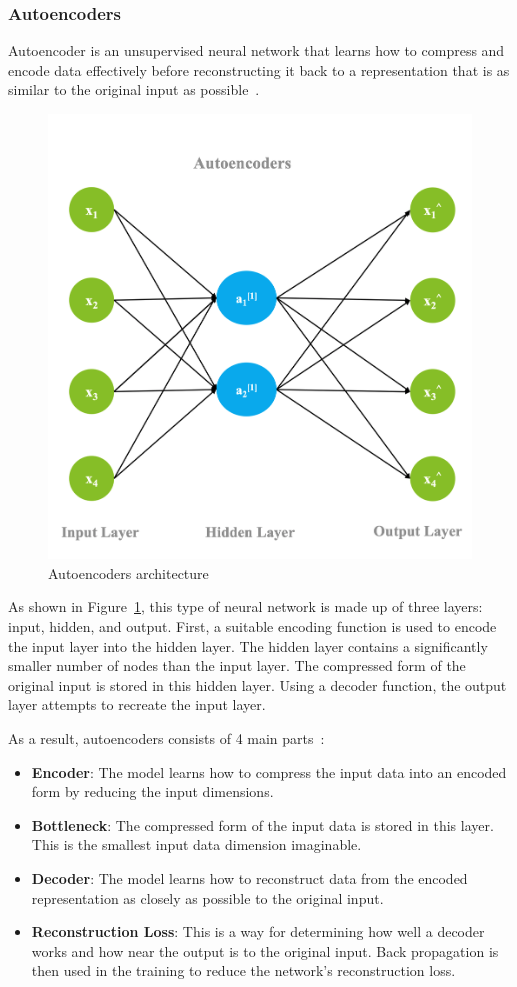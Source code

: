 \subsubsection{Autoencoders}

Autoencoder is an unsupervised neural network that learns how to compress and encode data effectively before reconstructing it back to a representation that is as similar to the original input as possible~\cite{Badr2019Auto-Encoder:For}.

\begin{figure}[htbp]
    \centering
    \includegraphics[width=0.7\linewidth]{Chapters/Figures/autoencoders.png}
    \caption{Autoencoders architecture~\cite{Madhavan2021DeepDeveloper}}
    \label{fig:autoencoders}
\end{figure}

As shown in Figure~\ref{fig:autoencoders}, this type of neural network is made up of three layers: input, hidden, and output. First, a suitable encoding function is used to encode the input layer into the hidden layer. The hidden layer contains a significantly smaller number of nodes than the input layer. The compressed form of the original input is stored in this hidden layer. Using a decoder function, the output layer attempts to recreate the input layer. 

As a result, autoencoders consists of 4 main parts~\cite{Bandyopadhyay2021AnKnow,Badr2019Auto-Encoder:For}:

\begin{itemize}
    \item \textbf{Encoder}: The model learns how to compress the input data into an encoded form by reducing the input dimensions.
    \item \textbf{Bottleneck}: The compressed form of the input data is stored in this layer. This is the smallest input data dimension imaginable.
    \item \textbf{Decoder}: The model learns how to reconstruct data from the encoded representation as closely as possible to the original input.
    \item \textbf{Reconstruction Loss}: This is a way for determining how well a decoder works and how near the output is to the original input. Back propagation is then used in the training to reduce the network's reconstruction loss.
\end{itemize}

